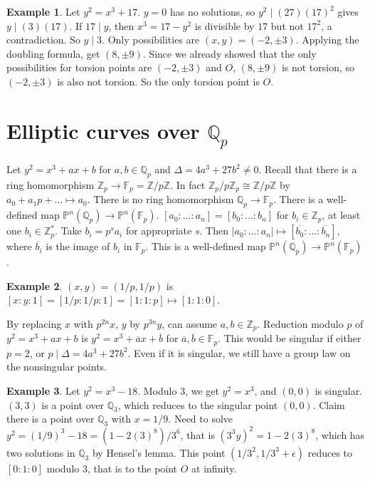 \documentclass{article}
\newcommand{\F}{\mathbb{F}}
\newcommand{\Z}{\mathbb{Z}}
\newcommand{\Q}{\mathbb{Q}}
\renewcommand{\P}{\mathbb{P}}
\newcommand{\rb}[1]{\left( #1 \right)}
\renewcommand{\sb}[1]{\left[ #1 \right]}
\newcommand{\abs}[1]{\left\lvert #1 \right\rvert}
\theoremstyle{definition}\newtheorem{definition}{Definition}[section]
\theoremstyle{definition}\newtheorem{remark}[definition]{Remark}
\theoremstyle{definition}\newtheorem*{example}{Example}
\theoremstyle{definition}\newtheorem*{note}{Note}
\begin{document}
\begin{example}
Let $ y^2 = x^3 + 17 $. $ y = 0 $ has no solutions, so $ y^2 \mid \rb{27}\rb{17}^2 $ gives $ y \mid \rb{3}\rb{17} $. If $ 17 \mid y $, then $ x^3 = 17 - y^2 $ is divisible by $ 17 $ but not $ 17^2 $, a contradiction. So $ y \mid 3 $. Only possibilities are $ \rb{x, y} = \rb{-2, \pm 3} $. Applying the doubling formula, get $ \rb{8, \pm 9} $. Since we already showed that the only possibilities for torsion points are $ \rb{-2, \pm 3} $ and $ O $, $ \rb{8, \pm 9} $ is not torsion, so $ \rb{-2, \pm 3} $ is also not torsion. So the only torsion point is $ O $.
\end{example}


\section{Elliptic curves over $ \Q_p $}

Let $ y^2 = x^3 + ax + b $ for $ a, b \in \Q_p $ and $ \Delta = 4a^3 + 27b^2 \ne 0 $. Recall that there is a ring homomorphism $ \Z_p \to \F_p = \Z / p\Z $. In fact $ \Z_p / p\Z_p \cong \Z / p\Z $ by $ a_0 + a_1p + \dots \mapsto a_0 $. There is no ring homomorphism $ \Q_p \to \F_p $. There is a well-defined map $ \P^n\rb{\Q_p} \to \P^n\rb{\F_p} $. $ \sb{a_0 : \dots : a_n} = \sb{b_0 : \dots : b_n} $ for $ b_i \in \Z_p $, at least one $ b_i \in \Z_p^* $. Take $ b_i = p^sa_i $ for appropriate $ s $. Then $ \abs{a_0 : \dots : a_n} \mapsto \sb{\overline{b_0} : \dots : \overline{b_n}} $, where $ \overline{b_i} $ is the image of $ b_i $ in $ \F_p $. This is a well-defined map $ \P^n\rb{\Q_p} \to \P^n\rb{\F_p} $.

\begin{example}
$ \rb{x, y} = \rb{1 / p, 1 / p} $ is $ \sb{x : y : 1} = \sb{1 / p : 1 / p : 1} = \sb{1 : 1 : p} \mapsto \sb{1 : 1 : 0} $.
\end{example}

By replacing $ x $ with $ p^{2n}x $, $ y $ by $ p^{3n}y $, can assume $ a, b \in \Z_p $. Reduction modulo $ p $ of $ y^2 = x^3 + ax + b $ is $ y^2 = x^3 + \overline{a}x + \overline{b} $ for $ \overline{a}, \overline{b} \in \F_p $. This would be singular if either $ p = 2 $, or $ p \mid \Delta = 4a^3 + 27b^2 $. Even if it is singular, we still have a group law on the nonsingular points.

\begin{example}
Let $ y^2 = x^3 - 18 $. Modulo $ 3 $, we get $ y^2 = x^3 $, and $ \rb{0, 0} $ is singular. $ \rb{3, 3} $ is a point over $ \Q_3 $, which reduces to the singular point $ \rb{0, 0} $. Claim there is a point over $ \Q_3 $ with $ x = 1 / 9 $. Need to solve $ y^2 = \rb{1 / 9}^3 - 18 = \rb{1 - 2\rb{3}^8} / 3^6 $, that is $ \rb{3^3y}^2 = 1 - 2\rb{3}^8 $, which has two solutions in $ \Q_3 $ by Hensel's lemma. This point $ \rb{1 / 3^2, 1 / 3^3 + \epsilon} $ reduces to $ \sb{0 : 1 : 0} $ modulo $ 3 $, that is to the point $ O $ at infinity.
\end{example}
\end{document}
